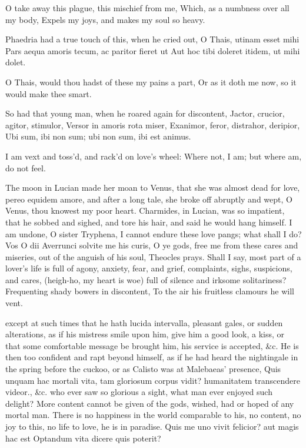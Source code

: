 {O take away this plague, this mischief from me,
Which, as a numbness over all my body,
Expels my joys, and makes my soul so heavy.

Phaedria had a true touch of this, when he cried out,
O Thais, utinam esset mihi
Pars aequa amoris tecum, ac paritor fieret ut
Aut hoc tibi doleret itidem, ut mihi dolet.

O Thais, would thou hadst of these my pains a part,
Or as it doth me now, so it would make thee smart.

So had that young man, when he roared again for discontent,
Jactor, crucior, agitor, stimulor,
Versor in amoris rota miser,
Exanimor, feror, distrahor, deripior,
Ubi sum, ibi non sum; ubi non sum, ibi est animus.

I am vext and toss'd, and rack'd on love's wheel:
Where not, I am; but where am, do not feel.

The moon in Lucian made her moan to Venus, that she was almost
dead for love, pereo equidem amore, and after a long tale, she broke
off abruptly and wept, O Venus, thou knowest my poor heart.
Charmides, in Lucian, was so impatient, that he sobbed and
sighed, and tore his hair, and said he would hang himself. I am undone,
O sister Tryphena, I cannot endure these love pangs; what shall I do?
Vos O dii Averrunci solvite me his curis, O ye gods, free me from these
cares and miseries, out of the anguish of his soul, Theocles
prays. Shall I say, most part of a lover's life is full of agony,
anxiety, fear, and grief, complaints, sighs, suspicions, and cares,
(heigh-ho, my heart is woe) full of silence and irksome solitariness?
Frequenting shady bowers in discontent,
To the air his fruitless clamours he will vent.

except at such times that he hath lucida intervalla, pleasant gales, or
sudden alterations, as if his mistress smile upon him, give him a good
look, a kiss, or that some comfortable message be brought him, his
service is accepted, \&c.
He is then too confident and rapt beyond himself, as if he had heard
the nightingale in the spring before the cuckoo, or as Calisto
was at Malebaeas' presence, Quis unquam hac mortali vita, tam gloriosum
corpus vidit? humanitatem transcendere videor., \&c. who ever saw so
glorious a sight, what man ever enjoyed such delight? More content
cannot be given of the gods, wished, had or hoped of any mortal man.
There is no happiness in the world comparable to his, no content, no
joy to this, no life to love, he is in paradise.
Quis me uno vivit felicior? aut magis hac est
Optandum vita dicere quis poterit?

}
